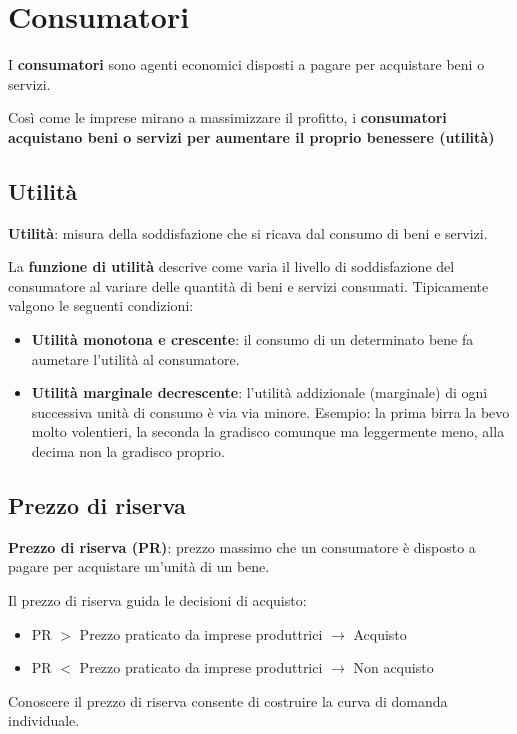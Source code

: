 \documentclass[../main.tex]{subfiles}
\begin{document}
\section{Consumatori}

I \textbf{consumatori} sono agenti economici disposti a pagare per acquistare beni o servizi.

Così come le imprese mirano a massimizzare il profitto, i \textbf{consumatori acquistano beni o servizi per aumentare il proprio benessere (utilità)}

\subsection{Utilità}

\textbf{Utilità}: misura della soddisfazione che si ricava dal consumo di beni e servizi.

La \textbf{funzione di utilità} descrive come varia il livello di soddisfazione del consumatore al variare delle quantità di beni e servizi consumati. Tipicamente valgono le seguenti condizioni:
\begin{itemize}
\item \textbf{Utilità monotona e crescente}: il consumo di un determinato bene fa aumetare l'utilità al consumatore.
\item \textbf{Utilità marginale decrescente}: l'utilità addizionale (marginale) di ogni successiva unità di consumo è via via minore. Esempio: la prima birra la bevo molto volentieri, la seconda la gradisco comunque ma leggermente meno, alla decima non la gradisco proprio.
\end{itemize}

\subsection{Prezzo di riserva}

\textbf{Prezzo di riserva (PR)}: prezzo massimo che un consumatore è disposto a pagare per acquistare un'unità di un bene.

Il prezzo di riserva guida le decisioni di acquisto:
\begin{itemize}
\item PR $>$ Prezzo praticato da imprese produttrici $\rightarrow$ Acquisto
\item PR $<$ Prezzo praticato da imprese produttrici $\rightarrow$ Non acquisto
\end{itemize}

Conoscere il prezzo di riserva consente di costruire la curva di domanda individuale.
\end{document}

